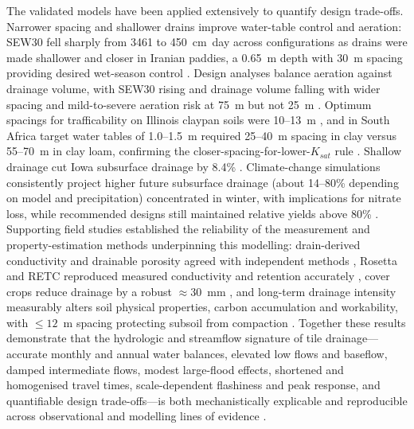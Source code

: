 The validated models have been applied extensively to quantify design trade-offs. Narrower spacing and shallower drains improve water-table control and aeration: SEW30 fell sharply from 3461 to 450~cm~day across configurations as drains were made shallower and closer in Iranian paddies, a 0.65~m depth with 30~m spacing providing desired wet-season control \parencite{DarziNaftchali2013,DarziNaftchally2014}. Design analyses balance aeration against drainage volume, with SEW30 rising and drainage volume falling with wider spacing and mild-to-severe aeration risk at 75~m but not 25~m \parencite{Verma2014,Hirekhan2007}. Optimum spacings for trafficability on Illinois claypan soils were 10--13~m \parencite{MOSTAGHIMI1989}, and in South Africa target water tables of 1.0--1.5~m required 25--40~m spacing in clay versus 55--70~m in clay loam, confirming the closer-spacing-for-lower-$K_{sat}$ rule \parencite{Malota2015}. Shallow drainage cut Iowa subsurface drainage by 8.4\% \parencite{Zhou2013,Mendez2004}. Climate-change simulations consistently project higher future subsurface drainage (about 14--80\% depending on model and precipitation) concentrated in winter, with implications for nitrate loss, while recommended designs still maintained relative yields above 80\% \parencite{Singh2009,Chen2016,Feng2018}. Supporting field studies established the reliability of the measurement and property-estimation methods underpinning this modelling: drain-derived conductivity and drainable porosity agreed with independent methods \parencite{BUCKLAND1986}, Rosetta and RETC reproduced measured conductivity and retention accurately \parencite{Malota2022,Malota2024}, cover crops reduce drainage by a robust $\approx30$~mm \parencite{Meyer2019}, and long-term drainage intensity measurably alters soil physical properties, carbon accumulation and workability, with $\le12$~m spacing protecting subsoil from compaction \parencite{Omonode2025,Mante2022,Mante2018,Frison2009,Roy2020}. Together these results demonstrate that the hydrologic and streamflow signature of tile drainage---accurate monthly and annual water balances, elevated low flows and baseflow, damped intermediate flows, modest large-flood effects, shortened and homogenised travel times, scale-dependent flashiness and peak response, and quantifiable design trade-offs---is both mechanistically explicable and reproducible across observational and modelling lines of evidence \parencite{Ahmadi1995,HASEGAWA1994,GALLICHAND1992b,MCCARTHY1992,PalaciosVélez2004,Khan2007,Prathapar1996,Ghorbani2015,Skaggs2017,Singh2006,Singh1999,Gaj2022}.
